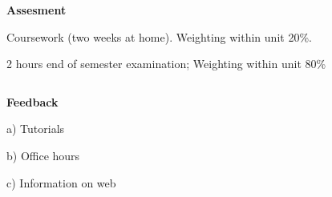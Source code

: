 


\centerline {\bf Assesment}

\smallskip

    Coursework (two weeks at home).  Weighting within unit 20\%.


\bigskip


  2 hours end of semester examination;  Weighting within unit 80\%

     $$ $$
        

\centerline {\bf Feedback}

a) Tutorials 

b) Office hours

c) Information on web 



 \bye
